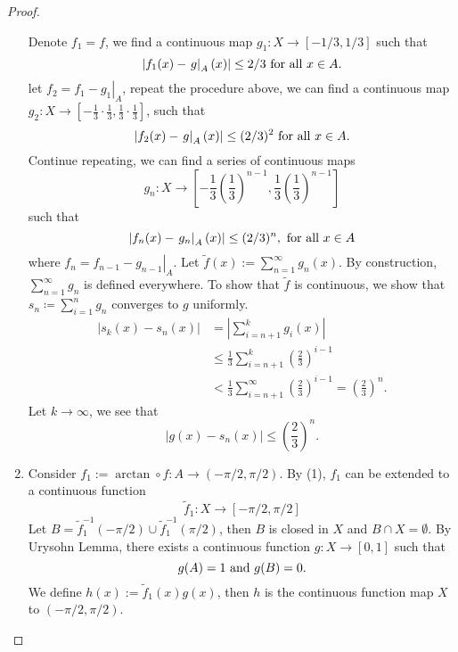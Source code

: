 \begin{proof}
\begin{enumerate}
        Denote \( f_1 = f \), we find a continuous map \( g_1: X \to [-1/3, 1/3] \) such that
        \[
          \left\vert f_1(x) - \left. g \right\vert_A(x) \right\vert \leq 2 / 3 \textmd{ for all }  x \in A .
        \]
        let \( f_2 = f_1 - \left. g_1 \right\vert_A \), repeat the procedure above, we can find a continuous map \( g_2: X \to [-\frac{1}{3} \cdot \frac{1}{3}, \frac{1}{3} \cdot \frac{1}{3}] \), such that
        \[
           \left\vert f_2(x) - \left. g \right\vert_A(x) \right\vert \leq (2 / 3)^2  \textmd{ for all }  x \in A .
        \]
        Continue repeating, we can find a series of continuous maps
        \[
          g_n: X \to \left[-\frac{1}{3}(\frac{1}{3})^{n - 1}, \frac{1}{3}(\frac{1}{3})^{n - 1}\right]
        \]
        such that
        \[
          \left\vert f_n(x) - \left. g_n \right\vert_A(x) \right\vert \leq (2 / 3)^n, \textmd{ for all } x \in A
        \]
        where \( f_n = f_{n - 1} - \left. g_{n - 1} \right\vert_A \).
        Let \( \widetilde{f}(x) := \sum_{n = 1}^\infty g_n(x) \).
        By construction,\( \sum_{n = 1}^\infty g_n \) is defined everywhere.
        To show that \( \tilde{f} \) is continuous, we show that \( s_n \coloneq \sum_{i = 1}^n g_n \) converges to \( g \) uniformly.
        \begin{align*}
        \left\vert s_k(x) - s_n(x) \right\vert &= \left\vert \sum_{i = n + 1}^k g_i(x) \right\vert\\
                                               &\leq \frac{1}{3} \sum_{i = n + 1}^k \left(\frac{2}{3}\right)^{i - 1}\\
                                               &< \frac{1}{3} \sum_{i = n + 1}^\infty \left(\frac{2}{3}\right)^{i - 1} = \left(\frac{2}{3}\right)^n
        .\end{align*}
    Let \( k \to \infty \), we see that
    \[
      \left\vert g(x) - s_n(x) \right\vert \leq \left(\frac{2}{3}\right)^n.
    \]
    \item Consider \( f_1 := \arctan \circ f: A \to (-\pi/2, \pi/2) \).
      By (1), \( f_1 \) can be extended to a continuous function
      \[
        \widetilde{f}_1: X \to [-\pi / 2, \pi / 2]
      \]
      Let \( B = \widetilde{f}_1^{-1}(-\pi / 2) \cup \widetilde{f}_1^{-1}(\pi / 2) \), then \( B \) is closed in \( X \) and \( B \cap X = \emptyset \).
      By Urysohn Lemma, there exists a continuous function \( g: X \to [0, 1] \) such that
      \[
        g(A) = 1 \textmd{ and } g(B) = 0.
      \]
      We define \( h(x) := \widetilde{f}_1(x) g(x) \), then \( h \) is the continuous function map \( X \) to \( (-\pi / 2, \pi / 2) \).
  \end{enumerate}
\end{proof}

